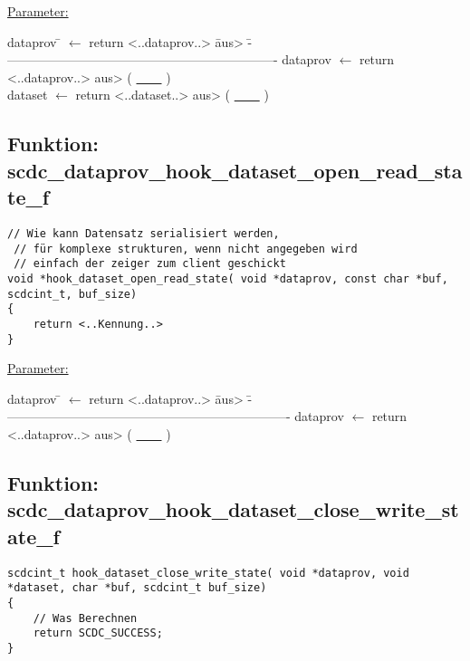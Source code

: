\underline{Parameter:}
\begin{tabbing}
dataprov \= $\leftarrow$ return <..dataprov..> \= aus> \= ----------------------------------------------------------------- \kill
dataprov \> $\leftarrow$ return <..dataprov..> \> aus> \> ( \underline{~~~~} )\\
dataset  \> $\leftarrow$ return <..dataset..>  \> aus> \> ( \underline{~~~~} )\\
\end{tabbing}


\subsection{\textbf{Funktion:} scdc\_dataprov\_hook\_dataset\_open\_read\_state\_f}\label{scdc_dataprov_hook_dataset_open_read_state_f}
\begin{lstlisting}[escapechar={~}]
 // Wie kann Datensatz serialisiert werden, 
 // für komplexe strukturen, wenn nicht angegeben wird 
 // einfach der zeiger zum client geschickt
void *hook_dataset_open_read_state( void *dataprov, const char *buf, scdcint_t, buf_size)
{
	return <..Kennung..>
}
\end{lstlisting}

\underline{Parameter:}
\begin{tabbing}
dataprov \= $\leftarrow$ return <..dataprov..> \= aus> \= -------------------------------------------------------------------- \kill
dataprov \> $\leftarrow$ return <..dataprov..> \> aus> \> ( \underline{~~~~} )\\
\end{tabbing}

\subsection{\textbf{Funktion:} scdc\_dataprov\_hook\_dataset\_close\_write\_state\_f}\label{scdc_dataprov_hook_dataset_close_write_state_f}
\begin{lstlisting}[escapechar={~}]
scdcint_t hook_dataset_close_write_state( void *dataprov, void *dataset, char *buf, scdcint_t buf_size)
{
	// Was Berechnen
	return SCDC_SUCCESS;
}
\end{lstlisting}

